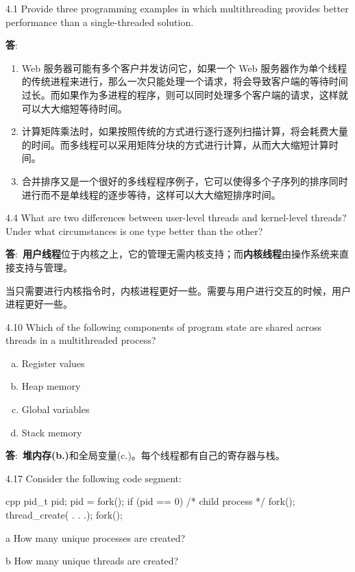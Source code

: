 \documentclass[12pt,a4paper]{article}
\newenvironment{problems}{\begin{list}{}{\renewcommand{\makelabel}[1]{\textbf{##1}\hfil}}}{\end{list}}
\newenvironment{steps}{\begin{list}{}{\renewcommand{\makelabel}[1]{##1.\hfil}}}{\end{list}}
\providecommand{\ans}{\textbf{答}:~}
\begin{document}
\begin{problems}
    \item[4.1] Provide three programming examples in which multithreading provides
    better performance than a single-threaded solution.

    \ans \begin{enumerate}
        \item Web 服务器可能有多个客户并发访问它，如果一个 Web 服务器作为单个线程的传统进程来进行，那么一次只能处理一个请求，将会导致客户端的等待时间过长。而如果作为多进程的程序，则可以同时处理多个客户端的请求，这样就可以大大缩短等待时间。
        \item 计算矩阵乘法时，如果按照传统的方式进行逐行逐列扫描计算，将会耗费大量的时间。而多线程可以采用矩阵分块的方式进行计算，从而大大缩短计算时间。
        \item 合并排序又是一个很好的多线程程序例子，它可以使得多个子序列的排序同时进行而不是单线程的逐步等待，这样可以大大缩短排序时间。
    \end{enumerate}
    \item[4.4] What are two differences between user-level threads and kernel-level
    threads? Under what circumstances is one type better than the other?
    
    \ans \textbf{用户线程}位于内核之上，它的管理无需内核支持；而\textbf{内核线程}由操作系统来直接支持与管理。

    当只需要进行内核指令时，内核进程更好一些。需要与用户进行交互的时候，用户进程更好一些。
    \item[4.10] Which of the following components of program state are shared across
    threads in a multithreaded process?
    \begin{enumerate}[a.]
        \item Register values
        \item Heap memory
        \item Global variables
        \item Stack memory
    \end{enumerate}

    \ans \textbf{堆内存(b.)}和全局变量(c.)。每个线程都有自己的寄存器与栈。
    \item[4.17] Consider the following code segment:
    \begin{code}{cpp}
pid_t pid;
pid = fork();
if (pid == 0) { /* child process */
    fork();
    thread_create( . . .);
}
fork();
    \end{code} 
    \begin{steps}
        \item[a] How many unique processes are created?
        \item[b] How many unique threads are created?
    \end{steps}
    

\end{problems}
\end{document}
